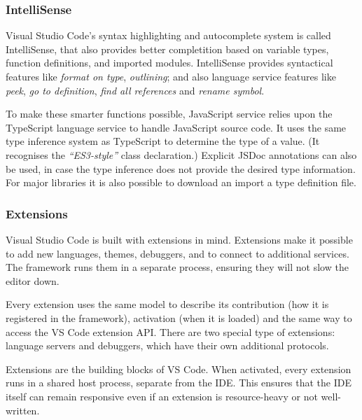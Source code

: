\subsubsection{IntelliSense}
Visual Studio Code's syntax highlighting and autocomplete system is called IntelliSense, that also provides better completition based on variable types, function definitions, and imported modules. IntelliSense provides syntactical features like \emph{format on type}, \emph{outlining}; and also language service features like \emph{peek}, \emph{go to definition}, \emph{find all references} and \emph{rename symbol}.

To make these smarter functions possible, JavaScript service relies upon the TypeScript language service to handle JavaScript source code. It uses the same type inference system as TypeScript to determine the type of a value. (It recognises the \emph{``ES3-style''} class declaration.) Explicit JSDoc annotations can also be used, in case the type inference does not provide the desired type information. For major libraries it is also possible to download an import a type definition file.

\subsubsection{Extensions}
Visual Studio Code is built with extensions in mind. Extensions make it possible to add new languages, themes, debuggers, and to connect to additional services. The framework runs them in a separate process, ensuring they will not slow the editor down.

Every extension uses the same model to describe its contribution (how it is registered in the framework), activation (when it is loaded) and the same way to access the VS Code extension API. There are two special type of extensions: language servers and debuggers, which have their own additional protocols.

Extensions are the building blocks of VS Code. When activated, every extension runs in a shared host process, separate from the IDE. This ensures that the IDE itself can remain responsive even if an extension is resource-heavy or not well-written.

